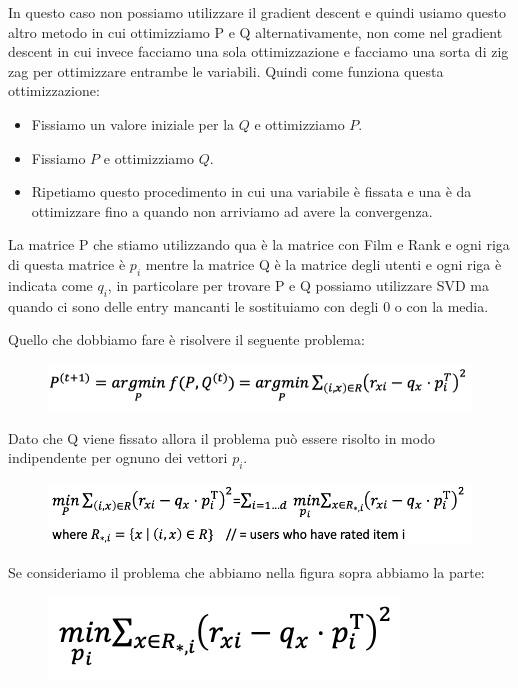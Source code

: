 \documentclass[14pt]{extreport}
\begin{document}
In questo caso non possiamo utilizzare il gradient descent e quindi usiamo questo altro metodo in cui ottimizziamo P e Q alternativamente, non come
nel gradient descent in cui invece facciamo una sola ottimizzazione e facciamo una sorta di zig zag per ottimizzare entrambe le variabili. Quindi come
funziona questa ottimizzazione:
\begin{itemize}
	\item Fissiamo un valore iniziale per la $Q$ e ottimizziamo $P$.
	\item Fissiamo $P$ e ottimizziamo $Q$.
	\item Ripetiamo questo procedimento in cui una variabile è fissata e una è da ottimizzare fino a quando non arriviamo ad avere la convergenza.
\end{itemize}

La matrice P che stiamo utilizzando qua è la matrice con Film e Rank e ogni riga di questa matrice è $p_i$ mentre la matrice Q è la matrice degli
utenti e ogni riga è indicata come $q_i$, in particolare per trovare P e Q possiamo utilizzare SVD ma quando ci sono delle entry mancanti le
sostituiamo con degli 0 o con la media.

Quello che dobbiamo fare è risolvere il seguente problema:

\begin{figure}[H]
	\centering
	\includegraphics[width=0.7\linewidth]{517.jpeg}
\end{figure}

Dato che Q viene fissato allora il problema può essere risolto in modo indipendente per ognuno dei vettori $p_i$.

\begin{figure}[H]
	\centering
	\includegraphics[width=0.7\linewidth]{518.jpeg}
\end{figure}

Se consideriamo il problema che abbiamo nella figura sopra abbiamo la parte:


\begin{figure}[H]
	\centering
	\includegraphics[width=0.7\linewidth]{519.jpeg}
\end{figure}
\end{document}
